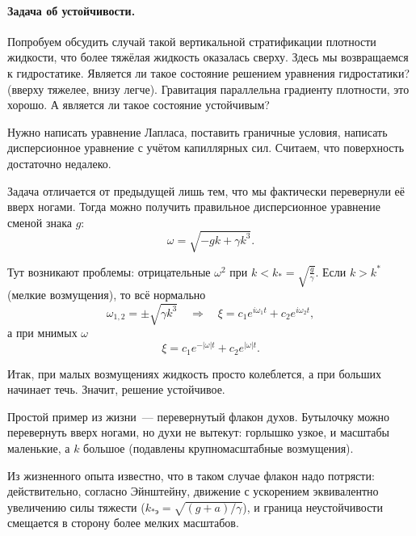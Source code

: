 \paragraph{Задача об устойчивости.} Попробуем обсудить случай такой вертикальной стратификации плотности жидкости, что более тяжёлая жидкость оказалась сверху.
Здесь мы возвращаемся к гидростатике.
Является ли такое состояние решением уравнения гидростатики? (вверху тяжелее, внизу легче).
Гравитация параллельна градиенту плотности, это хорошо.
А является ли такое состояние устойчивым?

Нужно написать уравнение Лапласа, поставить граничные условия, написать дисперсионное уравнение с учётом капиллярных сил.
Считаем, что поверхность достаточно недалеко.

Задача отличается от предыдущей лишь тем, что мы фактически перевернули её вверх ногами. Тогда можно получить правильное дисперсионное уравнение сменой знака $g$:
\begin{equation}
    \omega = \sqrt{-gk+\gamma k^3}.
\end{equation}

Тут возникают проблемы: отрицательные $\omega^2$ при $k < k_* = \sqrt{\frac{g}{\gamma}}$. Если $k>k^*$ (мелкие возмущения), то всё нормально
\begin{equation}
    \omega_{1,2} = \pm\sqrt{\gamma k^3}
    \quad \Rightarrow \quad
    \xi = c_1e^{i\omega_1 t}+c_2e^{i\omega_2 t},
\end{equation}
а при мнимых $\omega$
\begin{equation}
    \xi = c_1e^{-|\omega|t}+c_2e^{|\omega|t}.
\end{equation}

Итак, при малых возмущениях жидкость просто колеблется, а при больших начинает течь. Значит, решение устойчивое.

Простой пример из жизни~--- перевернутый флакон духов. Бутылочку можно перевернуть вверх ногами, но духи не вытекут: горлышко узкое, и масштабы маленькие, а $k$ большое (подавлены крупномасштабные возмущения).

Из жизненного опыта известно, что в таком случае флакон надо потрясти: действительно, согласно Эйнштейну, движение с ускорением эквивалентно увеличению силы тяжести ($k_{*\text{э}} = \sqrt{(g+a)/\gamma}$), и граница неустойчивости смещается в сторону более мелких масштабов.


